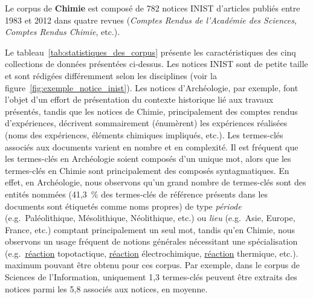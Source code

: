   Le corpus de \textbf{Chimie} est composé de 782 notices INIST d'articles
  publiés entre 1983 et 2012 dans quatre revues (\textit{Comptes Rendus de
  l'Académie des Sciences}, \textit{Comptes Rendus Chimie}, etc.).

  Le tableau~\ref{tab:statistiques_des_corpus} présente les caractéristiques des
  cinq collections de données présentées ci-dessus.
  Les notices INIST sont de petite taille et sont rédigées différemment selon
  les disciplines (voir la figure~\ref{fig:exemple_notice_inist}). Les notices
  d'Archéologie, par exemple, font l'objet d'un effort de présentation du
  contexte historique lié aux travaux présentés, tandis que les notices de
  Chimie, principalement des comptes rendus d'expériences, décrivent
  sommairement (énumèrent) les expériences réalisées (noms des expériences,
  éléments chimiques impliqués, etc.). Les termes-clés associés aux documents
  varient en nombre et en complexité. Il est fréquent que les termes-clés en
  Archéologie soient composés d'un unique mot, alors que les termes-clés en
  Chimie sont principalement des composés syntagmatiques. En effet, en
  Archéologie, nous observons qu'un grand nombre de termes-clés sont des entités
  nommées (41,3~\% des termes-clés de référence présents dans les documents sont
  étiquetés comme noms propres) de type \textit{période}
  (e.g.~\og{}Paléolithique\fg{}, \og{}Mésolithique\fg{}, \og{}Néolithique\fg{},
  etc.) ou \textit{lieu} (e.g.~\og{}Asie\fg{}, \og{}Europe\fg{},
  \og{}France\fg{}, etc.) comptant principalement un seul mot, tandis qu'en
  Chimie, nous observons un usage fréquent de notions générales nécessitant une
  spécialisation (e.g.~\og{}\underline{réaction} topotactique\fg{},
  \og{}\underline{réaction} électrochimique\fg{}, \og{}\underline{réaction}
  thermique\fg{}, etc.). %
  maximum pouvant être obtenu pour ces corpus. Par exemple, dans le corpus de
  Sciences de l'Information, uniquement 1,3 termes-clés peuvent être extraits
  des notices parmi les 5,8 associés aux notices, en moyenne.
